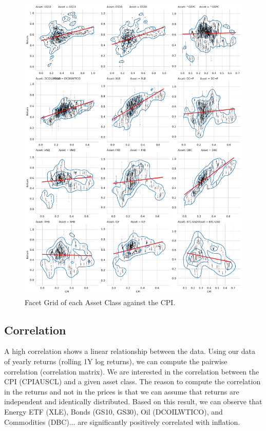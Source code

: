 \documentclass{article}
\begin{document}
\begin{figure}[H]
    \centering
    \includegraphics[width=1\textwidth]{paper/figure/CPI_Returns.pdf}
    \caption{Facet Grid of each Asset Class against the CPI.}
    \label{fig:mesh6}
\end{figure}



\subsection{Correlation}

A high correlation shows a linear relationship between the data. Using our data of yearly returns (rolling 1Y log returns), we can compute the pairwise correlation (correlation matrix). We are interested in the correlation between the CPI (CPIAUSCL) and a given asset class. The reason to compute the correlation in the returns and not in the prices is that we can assume that returns are independent and identically distributed. Based on this result, we can observe that Energy ETF (XLE), Bonds (GS10, GS30), Oil (DCOILWTICO), and Commodities (DBC)... are significantly positively correlated with inflation.
\end{document}
